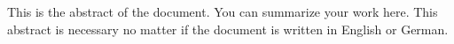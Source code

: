This is the abstract of the document. You can summarize your work here.
This abstract is necessary no matter if the document is written in English or German.